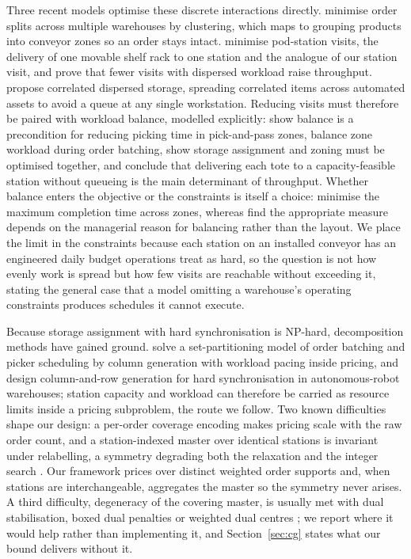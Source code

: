 \documentclass[]{interact}
\begin{document}
Three recent models optimise these discrete interactions directly. \citet{zhu2021} minimise order splits across multiple warehouses by clustering, which maps to grouping products into conveyor zones so an order stays intact. \citet{xie2021} minimise pod-station visits, the delivery of one movable shelf rack to one station and the analogue of our station visit, and prove that fewer visits with dispersed workload raise throughput. \citet{mirzaei2021} propose correlated dispersed storage, spreading correlated items across automated assets to avoid a queue at any single workstation. Reducing visits must therefore be paired with workload balance, modelled explicitly: \citet{tarczynski2023} show balance is a precondition for reducing picking time in pick-and-pass zones, \citet{pan2015} balance zone workload during order batching, \citet{vanGils2018} show storage assignment and zoning must be optimised together, and \citet{boysen2023} conclude that delivering each tote to a capacity-feasible station without queueing is the main determinant of throughput. Whether balance enters the objective or the constraints is itself a choice: \citet{saylam2023minmax} minimise the maximum completion time across zones, whereas \citet{vanheusden2022workload} find the appropriate measure depends on the managerial reason for balancing rather than the layout. We place the limit in the constraints because each station on an installed conveyor has an engineered daily budget operations treat as hard, so the question is not how evenly work is spread but how few visits are reachable without exceeding it, \citet{vanheusden2023practical} stating the general case that a model omitting a warehouse's operating constraints produces schedules it cannot execute.

Because storage assignment with hard synchronisation is NP-hard, decomposition methods have gained ground. \citet{muter2022} solve a set-partitioning model of order batching and picker scheduling by column generation with workload pacing inside pricing, and \citet{zhen2025} design column-and-row generation for hard synchronisation in autonomous-robot warehouses; station capacity and workload can therefore be carried as resource limits inside a pricing subproblem, the route we follow. Two known difficulties shape our design: a per-order coverage encoding makes pricing scale with the raw order count, and a station-indexed master over identical stations is invariant under relabelling, a symmetry degrading both the relaxation and the integer search \citep{vanderbeck2000dw}. Our framework prices over distinct weighted order supports and, when stations are interchangeable, aggregates the master so the symmetry never arises. A third difficulty, degeneracy of the covering master, is usually met with dual stabilisation, boxed dual penalties \citep{dumerle1999stabilized} or weighted dual centres \citep{wentges1997weighted}; we report where it would help rather than implementing it, and Section~\ref{sec:cg} states what our bound delivers without it.
\end{document}
